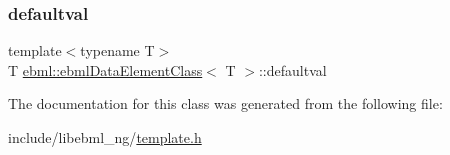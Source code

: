 \subsubsection{\texorpdfstring{defaultval}{defaultval}}
{\footnotesize\ttfamily template$<$typename T$>$ \\
T \mbox{\hyperlink{classebml_1_1ebmlDataElementClass}{ebml\+::ebml\+Data\+Element\+Class}}$<$ T $>$\+::defaultval}



The documentation for this class was generated from the following file\+:\begin{DoxyCompactItemize}
\item 
include/libebml\+\_\+ng/\mbox{\hyperlink{template_8h}{template.\+h}}\end{DoxyCompactItemize}
